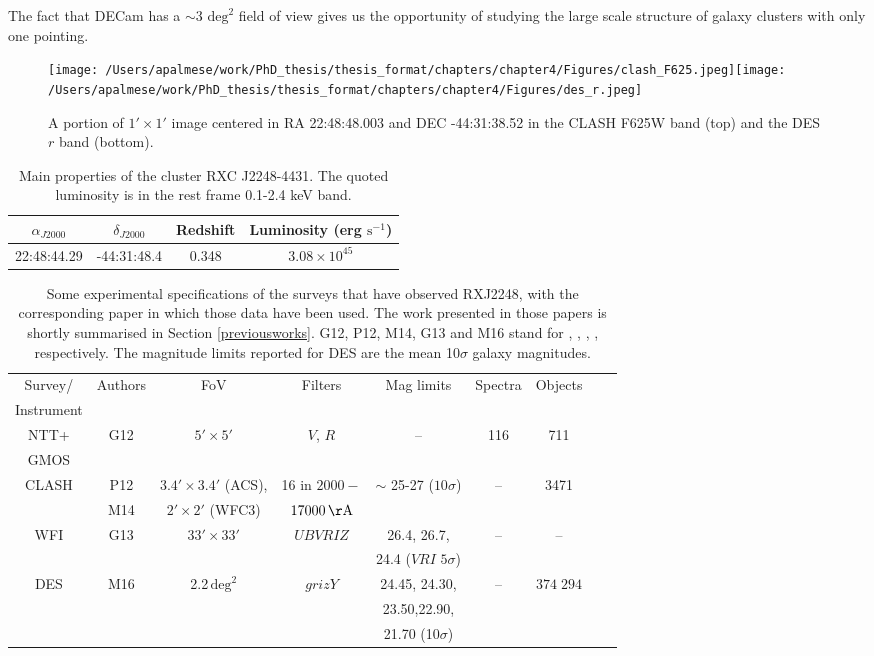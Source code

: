 {The fact that DECam has a $\sim 3$ $\textrm{deg}^2$ field of view gives us the opportunity of studying the large scale structure of galaxy clusters with only one pointing. 
\begin{figure}\centering
\texttt{[image: /Users/apalmese/work/PhD\_thesis/thesis\_format/chapters/chapter4/Figures/clash\_F625.jpeg]}\texttt{[image: /Users/apalmese/work/PhD\_thesis/thesis\_format/chapters/chapter4/Figures/des\_r.jpeg]}
\caption{A portion of $1'\times 1'$ image centered in RA 22:48:48.003 and DEC -44:31:38.52 in the CLASH F625W band (top) and the DES $r$ band (bottom).}\label{images}
\end{figure}
\begin{table}\centering
\begin{tabular}{cccc}
$\alpha_{J2000}$&$\delta_{J2000}$&Redshift& Luminosity (erg $\mathrm{s}^{-1}$)\\
\hline
22:48:44.29 &-44:31:48.4 & 0.348&$ 3.08 \times 10^{45}$
\\
\end{tabular}\caption{Main properties of the cluster RXC J2248-4431. The quoted luminosity is in the rest frame 0.1-2.4 keV band.}\label{properties}
\end{table}
\begin{table}
{\small
\centering
\begin{tabular}{c|cccccccc}
Survey/& Authors & FoV &Filters& Mag limits&Spectra&Objects\\
Instrument&&&&&&\\
\hline
NTT+&G12&$5'\times 5'$&$V$, $R$&--&116&711\\
GMOS&&&&&&\\
CLASH&P12&$3.4'\times3.4'$ (ACS), &16 in $2000-$&$\sim$ 25-27 ($10\sigma$)&-- &3471\\
& M14 &$2'\times2'$ (WFC3)&$17000\, \mathrm{\AA}$&&&\\
WFI&G13 &$33'\times 33'$& $UBVRIZ$&26.4, 26.7, &--&--\\
&&&&24.4 ($VRI$ $5\sigma$)&&&\\
DES & M16&2.2\,$\mathrm{deg}^2$&$grizY$& 24.45, 24.30,&--&$374\;294$\\
&&&&23.50,22.90,&&&\\
&&&&21.70 (10$\sigma$)&&&

\end{tabular}}\caption{Some experimental specifications of the surveys that have observed RXJ2248, with the corresponding paper in which those data have been used. The work presented in those papers is shortly summarised in Section \ref{previousworks}. G12, P12, M14, G13 and M16 stand for \citet{gomez}, \citet{postman}, \citet{monna}, \citet{gruen}, \citet{melchior} respectively. The magnitude limits reported for DES are the mean 10$\sigma$ galaxy magnitudes.}\label{surveys}
\end{table}

}
